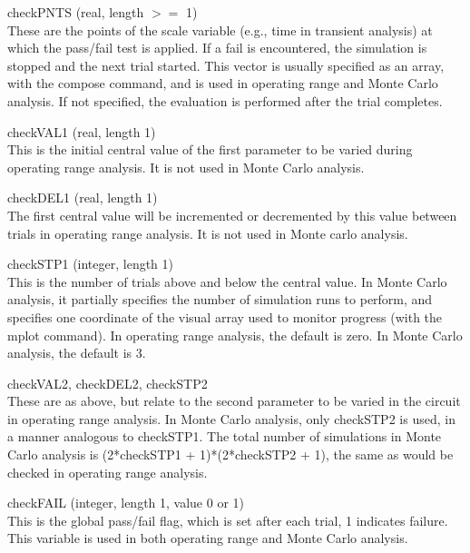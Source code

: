 \begin{description}
\item{{\et checkPNTS} (real, length $>=$ 1)}\\
These are the points of the scale variable (e.g., time in transient
analysis) at which the pass/fail test is applied.  If a fail is
encountered, the simulation is stopped and the next trial started. 
This vector is usually specified as an array, with the {\cb compose}
command, and is used in operating range and Monte Carlo analysis.  If
not specified, the evaluation is performed after the trial completes.

\item{{\et checkVAL1} (real, length 1)}\\
This is the initial central value of the first parameter to be varied
during operating range analysis.  It is not used in Monte Carlo
analysis.

\item{{\et checkDEL1} (real, length 1)}\\
The first central value will be incremented or decremented by this
value between trials in operating range analysis.  It is not used in
Monte carlo analysis.

\item{{\et checkSTP1} (integer, length 1)}\\
This is the number of trials above and below the central value.  In
Monte Carlo analysis, it partially specifies the number of simulation
runs to perform, and specifies one coordinate of the visual array used
to monitor progress (with the {\cb mplot} command).  In operating
range analysis, the default is zero.  In Monte Carlo analysis, the
default is 3.

\item{\et checkVAL2, checkDEL2, checkSTP2}\\
These are as above, but relate to the second parameter to be varied in
the circuit in operating range analysis.  In Monte Carlo analysis,
only {\et checkSTP2} is used, in a manner analogous to {\et
checkSTP1}.  The total number of simulations in Monte Carlo analysis
is (2*{\et checkSTP1} + 1)*(2*{\et checkSTP2} + 1), the same as would
be checked in operating range analysis.

\item{{\et checkFAIL}  (integer, length 1, value 0 or 1)}\\
This is the global pass/fail flag, which is set after each trial, 1
indicates failure.  This variable is used in both operating range and
Monte Carlo analysis.


\end{description}
